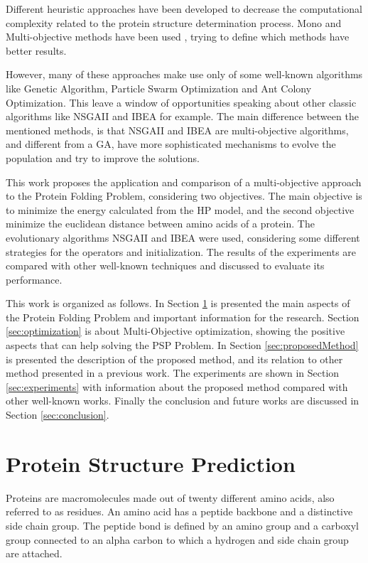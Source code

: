 Different heuristic approaches have been developed to decrease the computational complexity related to the protein structure determination process. Mono and Multi-objective methods have been used \cite{custodio2004investigation, hsu2003growth, krasnogor2002multimeme, lin2011protein, unger1993genetic}, trying to define which methods have better results.


However, many of these approaches make use only of some well-known algorithms like Genetic Algorithm, Particle Swarm Optimization and Ant Colony Optimization. This leave a window of opportunities speaking about other classic algorithms like NSGAII \cite{zitzler1998multiobjective} and IBEA \cite{zitzler2004indicator} for example. The main difference between the mentioned methods, is that NSGAII and IBEA are multi-objective algorithms, and different from a GA, have more sophisticated mechanisms to evolve the population and try to improve the solutions.


This work proposes the application and comparison of a multi-objective approach to the Protein Folding Problem, considering two objectives. The main objective is to minimize the energy calculated from the HP model, and the second objective minimize the euclidean distance between amino acids of a protein. The evolutionary algorithms NSGAII and IBEA were used, considering some different strategies for the operators and initialization. The results of the experiments are compared with other well-known techniques and discussed to evaluate its performance.


This work is organized as follows. In Section \ref{sec:proteinfolding} is presented the main aspects of the Protein Folding Problem and important information for the research. Section \ref{sec:optimization} is about Multi-Objective optimization, showing the positive aspects that can help solving the PSP Problem. In Section \ref{sec:proposedMethod} is presented the description of the proposed method, and its relation to other method presented in a previous work. The experiments are shown in Section \ref{sec:experiments} with information about the proposed method compared with other well-known works. Finally the conclusion and future works are discussed in Section \ref{sec:conclusion}.


\section{Protein Structure Prediction} \label{sec:proteinfolding}


Proteins are macromolecules made out of  twenty different amino acids, also referred to as residues. An amino acid has a peptide backbone and a distinctive side chain group. The peptide bond is defined by an amino group and a carboxyl group connected to an alpha carbon to which  a hydrogen and side chain group are attached.


